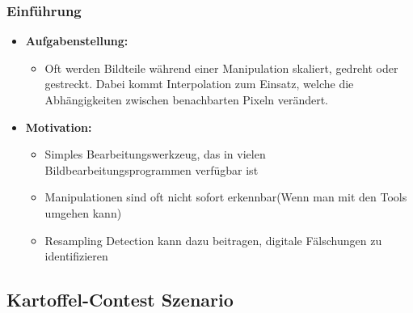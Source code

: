 \documentclass[11pt,t,usepdftitle=false,aspectratio=169]{beamer}
\begin{document}
\begin{frame}
	\frametitle{Einführung}
	\begin{itemize}
		\item \textbf{Aufgabenstellung:}\\
		\begin{itemize}
			\item Oft werden Bildteile während einer Manipulation skaliert, gedreht oder gestreckt. Dabei kommt Interpolation zum Einsatz, welche die Abhängigkeiten zwischen benachbarten Pixeln verändert.  
		\end{itemize} 
		\item \textbf{Motivation:} 
		\begin{itemize}
			\item Simples Bearbeitungswerkzeug, das in vielen Bildbearbeitungsprogrammen verfügbar ist
			\item Manipulationen sind oft nicht sofort erkennbar(Wenn man mit den Tools umgehen kann)
			\item Resampling Detection kann dazu beitragen, digitale Fälschungen zu identifizieren
		\end{itemize}
	\end{itemize}
\end{frame}

\subsection{Kartoffel-Contest Szenario}
\end{document}
